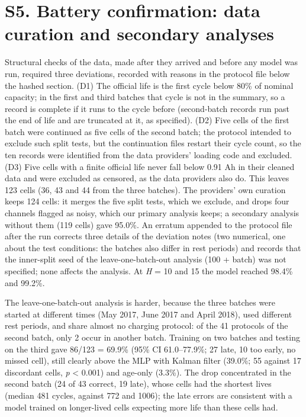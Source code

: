 \documentclass[11pt,a4paper]{article}
\begin{document}
\section*{S5. Battery confirmation: data curation and secondary analyses}

\noindent Structural checks of the data, made after they arrived and before any model was run, required three deviations, recorded with reasons in the protocol file below the hashed section. (D1) The official life is the first cycle below 80\% of nominal capacity; in the first and third batches that cycle is not in the summary, so a record is complete if it runs to the cycle before (second-batch records run past the end of life and are truncated at it, as specified). (D2) Five cells of the first batch were continued as five cells of the second batch; the protocol intended to exclude such split tests, but the continuation files restart their cycle count, so the ten records were identified from the data providers' loading code and excluded. (D3) Five cells with a finite official life never fall below 0.91 Ah in their cleaned data and were excluded as censored, as the data providers also do. This leaves 123 cells (36, 43 and 44 from the three batches). The providers' own curation keeps 124 cells: it merges the five split tests, which we exclude, and drops four channels flagged as noisy, which our primary analysis keeps; a secondary analysis without them (119 cells) gave 95.0\%. An erratum appended to the protocol file after the run corrects three details of the deviation notes (two numerical, one about the test conditions: the batches also differ in rest periods) and records that the inner-split seed of the leave-one-batch-out analysis (100 + batch) was not specified; none affects the analysis. At \textit{H} = 10 and 15 the model reached 98.4\% and 99.2\%.

\noindent The leave-one-batch-out analysis is harder, because the three batches were started at different times (May 2017, June 2017 and April 2018), used different rest periods, and share almost no charging protocol: of the 41 protocols of the second batch, only 2 occur in another batch. Training on two batches and testing on the third gave 86/123 = 69.9\% (95\% CI 61.0--77.9\%; 27 late, 10 too early, no missed cell), still clearly above the MLP with Kalman filter (39.0\%; 55 against 17 discordant cells, \textit{p} < 0.001) and age-only (3.3\%). The drop concentrated in the second batch (24 of 43 correct, 19 late), whose cells had the shortest lives (median 481 cycles, against 772 and 1006); the late errors are consistent with a model trained on longer-lived cells expecting more life than these cells had.
\end{document}
